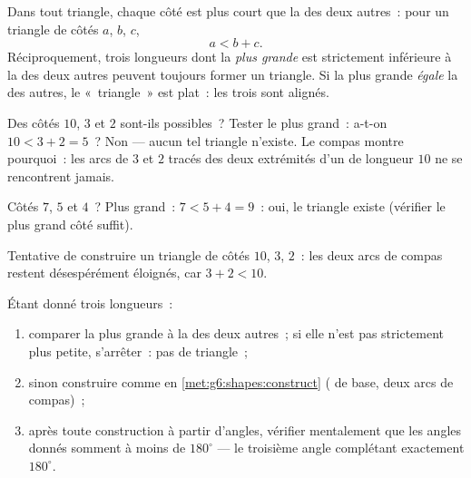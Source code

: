 \begin{theorem}\label{thm:g7:triangles:inequality}
Dans tout triangle, chaque côté est plus court que la  des deux
autres~: pour un triangle de côtés $a$, $b$, $c$,
\[
a < b + c .
\]
Réciproquement, trois longueurs dont la \emph{plus grande} est
strictement inférieure à la  des deux autres peuvent toujours
former un triangle. Si la plus grande \emph{égale} la  des
autres, le «~triangle~» est plat~: les trois  sont alignés.
\end{theorem}
\admitted

\begin{example}\label{ex:g7:triangles:inequality}
Des côtés $10$, $3$ et $2$ sont-ils possibles~? Tester le plus
grand~: a-t-on $10 < 3 + 2 = 5$~? Non --- aucun tel triangle
n'existe. Le compas montre pourquoi~: les arcs de  $3$ et $2$
tracés des deux extrémités d'un  de longueur $10$ ne se
rencontrent jamais.

Côtés $7$, $5$ et $4$~? Plus grand~: $7 < 5 + 4 = 9$~: oui, le
triangle existe (vérifier le plus grand côté suffit).
\end{example}

\begin{omfigure}

{\small Tentative de construire un triangle de côtés $10$, $3$, $2$~:
les deux arcs de compas restent désespérément éloignés, car
$3 + 2 < 10$.}
\end{omfigure}

\begin{method}\label{met:g7:triangles:construct}
Étant donné trois longueurs~:
\begin{enumerate}
  \item comparer la plus grande à la  des deux autres~; si elle
        n'est pas strictement plus petite, s'arrêter~: pas de
        triangle~;
  \item sinon construire comme en \cref{met:g6:shapes:construct}
        ( de base, deux arcs de compas)~;
  \item après toute construction à partir d'angles, vérifier
        mentalement que les angles donnés somment à moins de
        $180^\circ$ --- le troisième angle complétant exactement
        $180^\circ$.
\end{enumerate}
\end{method}

